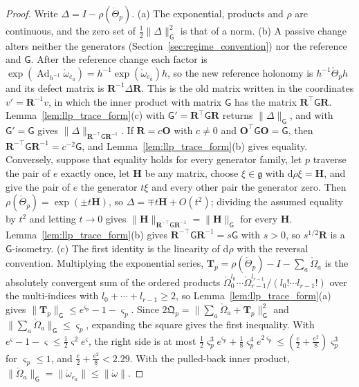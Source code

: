 \begin{proof}
Write $\Delta=I-\rho(\mathring\Theta_p)$.
(a) The exponential, products and $\rho$ are continuous, and the zero set of $\frac12\|\Delta\|_{\mathsf G}^2$ is that of a norm.
(b) A passive change alters neither the generators (Section~\ref{sec:regime_convention}) nor the reference and $\mathsf G$. After the reference change each factor is $\exp(\operatorname{Ad}_{h^{-1}}\mathring\omega_{e_a})=h^{-1}\exp(\mathring\omega_{e_a})h$, so the new reference holonomy is $h^{-1}\mathring\Theta_ph$ and its defect matrix is $\mathbf R^{-1}\Delta\mathbf R$. This is the old matrix written in the coordinates $v'=\mathbf R^{-1}v$, in which the inner product with matrix $\mathsf G$ has the matrix $\mathbf R^\top\mathsf G\mathbf R$. Lemma~\ref{lem:llp_trace_form}(c) with $\mathsf G'=\mathbf R^\top\mathsf G\mathbf R$ returns $\|\Delta\|_{\mathsf G}$, and with $\mathsf G'=\mathsf G$ gives $\|\Delta\|_{\mathbf R^{-\top}\mathsf G\mathbf R^{-1}}$. If $\mathbf R=c\mathbf O$ with $c\neq0$ and $\mathbf O^\top\mathsf G\mathbf O=\mathsf G$, then $\mathbf R^{-\top}\mathsf G\mathbf R^{-1}=c^{-2}\mathsf G$, and Lemma~\ref{lem:llp_trace_form}(b) gives equality. Conversely, suppose that equality holds for every generator family, let $p$ traverse the pair of $e$ exactly once, let $\mathbf H$ be any matrix, choose $\xi\in\mathfrak g$ with $\mathrm d\rho\xi=\mathbf H$, and give the pair of $e$ the generator $t\xi$ and every other pair the generator zero. Then $\rho(\mathring\Theta_p)=\exp(\pm t\mathbf H)$, so $\Delta=\mp t\mathbf H+O(t^2)$; dividing the assumed equality by $t^2$ and letting $t\to0$ gives $\|\mathbf H\|_{\mathbf R^{-\top}\mathsf G\mathbf R^{-1}}=\|\mathbf H\|_{\mathsf G}$ for every $\mathbf H$. Lemma~\ref{lem:llp_trace_form}(b) gives $\mathbf R^{-\top}\mathsf G\mathbf R^{-1}=s\mathsf G$ with $s>0$, so $s^{1/2}\mathbf R$ is a $\mathsf G$-isometry.
(c) The first identity is the linearity of $\mathrm d\rho$ with the reversal convention. Multiplying the exponential series, $\mathbf T_p=\rho(\mathring\Theta_p)-I-\sum_a\mathring\Omega_a$ is the absolutely convergent sum of the ordered products $\mathring\Omega_0^{l_0}\cdots\mathring\Omega_{r-1}^{l_{r-1}}/(l_0!\cdots l_{r-1}!)$ over the multi-indices with $l_0+\cdots+l_{r-1}\geq2$, so Lemma~\ref{lem:llp_trace_form}(a) gives $\|\mathbf T_p\|_{\mathsf G}\leq e^{\varsigma_p}-1-\varsigma_p$. Since $2\mathfrak Q_p=\|\sum_a\mathring\Omega_a+\mathbf T_p\|_{\mathsf G}^2$ and $\|\sum_a\mathring\Omega_a\|_{\mathsf G}\leq\varsigma_p$, expanding the square gives the first inequality. With $e^\varsigma-1-\varsigma\leq\frac12\varsigma^2e^\varsigma$, the right side is at most $\frac12\varsigma_p^3e^{\varsigma_p}+\frac18\varsigma_p^4e^{2\varsigma_p}\leq(\frac e2+\frac{e^2}8)\varsigma_p^3$ for $\varsigma_p\leq1$, and $\frac e2+\frac{e^2}8<2.29$. With the pulled-back inner product, $\|\mathring\Omega_a\|_{\mathsf G}=\|\mathring\omega_{e_a}\|\leq\|\mathring\omega\|$.
\end{proof}

